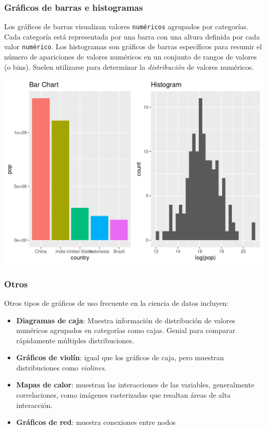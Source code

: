\documentclass[
]{book}
\providecommand{\tightlist}{%
  \setlength{\itemsep}{0pt}\setlength{\parskip}{0pt}}
\begin{document}
\hypertarget{gruxe1ficos-de-barras-e-histogramas}{%
\subsubsection{Gráficos de barras e histogramas}\label{gruxe1ficos-de-barras-e-histogramas}}

Los gráficos de barras visualizan valores \texttt{numéricos} agrupados por categorías. Cada categoría está representada por una barra con una altura definida por cada valor \texttt{numérico}. Los histogramas son gráficos de barras específicos para resumir el número de apariciones de valores numéricos en un conjunto de rangos de valores (o bins). Suelen utilizarse para determinar la \emph{distribución} de valores numéricos.

\includegraphics{img/hist.png}

\hypertarget{otros}{%
\subsubsection{Otros}\label{otros}}

Otros tipos de gráficos de uso frecuente en la ciencia de datos incluyen:

\begin{itemize}
\tightlist
\item
  \textbf{Diagramas de caja}: Muestra información de distribución de valores numéricos agrupados en categorías como cajas. Genial para comparar rápidamente múltiples distribuciones.
\item
  \textbf{Gráficos de violín}: igual que los gráficos de caja, pero muestran distribuciones como \emph{violines}.
\item
  \textbf{Mapas de calor}: muestran las interacciones de las variables, generalmente correlaciones, como imágenes rasterizadas que resaltan áreas de alta interacción.
\item
  \textbf{Gráficos de red}: muestra conexiones entre nodos
\end{itemize}
\end{document}
